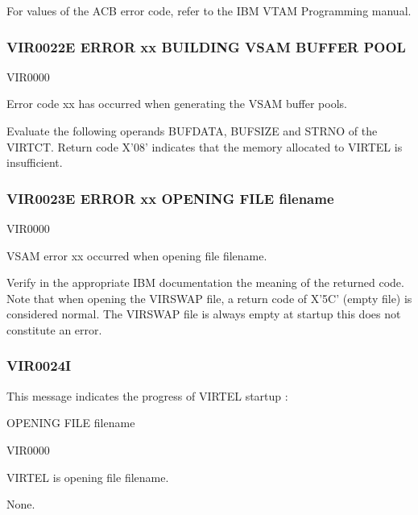 \documentclass[letterpaper,10pt,english]{sphinxmanual}
\begin{document}
\sphinxAtStartPar
For values of the ACB error code, refer to the IBM VTAM Programming manual.


\subsubsection{VIR0022E ERROR xx BUILDING VSAM BUFFER POOL}
\label{\detokenize{messages:vir0022e-error-xx-building-vsam-buffer-pool}}\begin{description}
\sphinxAtStartPar
VIR0000

\sphinxAtStartPar
Error code xx has occurred when generating the VSAM buffer pools.

\sphinxAtStartPar
Evaluate the following operands BUFDATA, BUFSIZE and STRNO of the VIRTCT. Return code X’08’ indicates that the memory allocated to VIRTEL is insufficient.

\end{description}


\subsubsection{VIR0023E ERROR xx OPENING FILE filename}
\label{\detokenize{messages:vir0023e-error-xx-opening-file-filename}}\begin{description}
\sphinxAtStartPar
VIR0000

\sphinxAtStartPar
VSAM error xx occurred when opening file filename.

\sphinxAtStartPar
Verify in the appropriate IBM documentation the meaning of the returned code. Note that when opening the VIRSWAP file, a return code of X’5C’ (empty file) is considered normal. The VIRSWAP file is always empty at start\sphinxhyphen{}up this does not constitute an error.

\end{description}


\subsubsection{VIR0024I}
\label{\detokenize{messages:vir0024i}}
\sphinxAtStartPar
This message indicates the progress of VIRTEL start\sphinxhyphen{}up :

\sphinxAtStartPar
OPENING FILE filename
\begin{description}
\sphinxAtStartPar
VIR0000

\sphinxAtStartPar
VIRTEL is opening file filename.

\sphinxAtStartPar
None.

\end{description}
\end{document}
